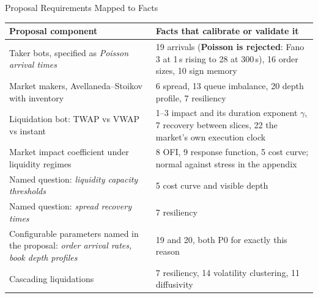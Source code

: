 \documentclass[aspectratio=169,10pt]{beamer}
\begin{document}
\begin{frame}{Proposal Requirements Mapped to Facts}
\scriptsize
\begin{tabularx}{\textwidth}{@{}L{0.85}L{1.15}@{}}
\toprule
\textbf{Proposal component} & \textbf{Facts that calibrate or validate it} \\
\midrule
Taker bots, specified as \emph{Poisson arrival times} &
19 arrivals (\textbf{Poisson is rejected}: Fano 3 at 1\,s rising to 28 at 300\,s),
16 order sizes, 10 sign memory \\[2pt]
Market makers, Avellaneda--Stoikov with inventory &
6 spread, 13 queue imbalance, 20 depth profile, 7 resiliency \\[2pt]
Liquidation bot: TWAP vs VWAP vs instant &
1--3 impact and its duration exponent $\gamma$, 7 recovery between slices,
22 the market's own execution clock \\[2pt]
Market impact coefficient under liquidity regimes &
8 OFI, 9 response function, 5 cost curve; normal against stress in the appendix \\[2pt]
Named question: \emph{liquidity capacity thresholds} & 5 cost curve and visible depth \\[2pt]
Named question: \emph{spread recovery times} & 7 resiliency \\[2pt]
Configurable parameters named in the proposal:
\emph{order arrival rates, book depth profiles} & 19 and 20, both P0 for exactly this reason \\[2pt]
Cascading liquidations & 7 resiliency, 14 volatility clustering, 11 diffusivity \\
\bottomrule
\end{tabularx}
\end{frame}
\end{document}
